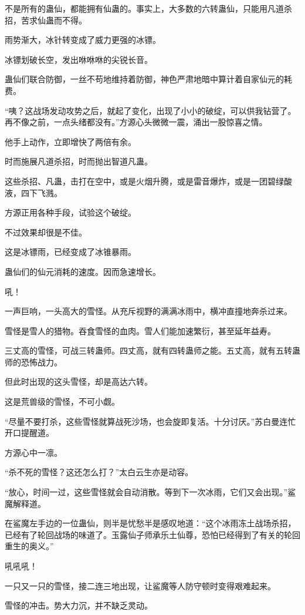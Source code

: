 \begin{this_body}
不是所有的蛊仙，都能拥有仙蛊的。事实上，大多数的六转蛊仙，只能用凡道杀招，苦求仙蛊而不得。

雨势渐大，冰针转变成了威力更强的冰镖。

冰镖划破长空，发出咻咻咻的尖锐长音。

蛊仙们联合防御，一丝不苟地维持着防御，神色严肃地暗中算计着自家仙元的耗费。

“咦？这战场发动攻势之后，就起了变化，出现了小小的破绽，可以供我钻营了。再不像之前，一点头绪都没有。”方源心头微微一震，涌出一股惊喜之情。

他手上动作，立即增快了两倍有余。

时而施展凡道杀招，时而抛出智道凡蛊。

这些杀招、凡蛊，击打在空中，或是火烟升腾，或是雷音爆炸，或是一团碧绿酸液，四下飞溅。

方源正用各种手段，试验这个破绽。

不过效果却很是不佳。

这是冰镖雨，已经变成了冰锥暴雨。

蛊仙们的仙元消耗的速度。因而急速增长。

吼！

一声巨响，一头高大的雪怪。从充斥视野的满满冰雨中，横冲直撞地奔杀过来。

雪怪是雪人的猎物。吞食雪怪的血肉。雪人们能加速繁衍，甚至延年益寿。

三丈高的雪怪，可战三转蛊师。四丈高，就有四转蛊师之能。五丈高，就有五转蛊师的恐怖战力。

但此时出现的这头雪怪，却是高达六转。

这是荒兽级的雪怪，不可小觑。

“尽量不要打杀，这些雪怪就算战死沙场，也会旋即复活。十分讨厌。”苏白曼连忙开口提醒道。

方源心中一凛。

“杀不死的雪怪？这还怎么打？”太白云生亦是动容。

“放心，时间一过，这些雪怪就会自动消散。等到下一次冰雨，它们又会出现。”鲨魔解释道。

在鲨魔左手边的一位蛊仙，则半是忧愁半是感叹地道：“这个冰雨冻土战场杀招，已经有了轮回战场的味道了。玉露仙子师承乐土仙尊，恐怕已经得到了有关的轮回重生的奥义。”

吼吼吼！

一只又一只的雪怪，接二连三地出现，让鲨魔等人防守顿时变得艰难起来。

雪怪的冲击。势大力沉，并不缺乏灵动。


\end{this_body}
